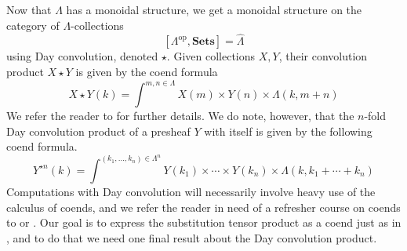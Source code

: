 \documentclass{amsbook} %
\newcommand{\mb}{\mathbf}
\numberwithin{section}{chapter}
\begin{document}
Now that $\mathbb{\Lambda}$ has a monoidal structure, we get a monoidal structure on the category of $\mathbb{\Lambda}$-collections
\[
[\mathbb{\Lambda}^{\textrm{op}}, \mb{Sets}] = \hat{\mathbb{\Lambda}}
\]
using Day convolution, denoted $\star$.  Given collections $X, Y$, their convolution product $X \star Y$ is given by the coend formula
\[
X \star Y (k) = \int^{m,n \in \mathbb{\Lambda}} X(m) \times Y(n) \times \mathbb{\Lambda}(k, m+n)
\]
We refer the reader to \cite{day-thesis} for further details.  We do note, however, that the $n$-fold Day convolution product of a presheaf $Y$ with itself is given by the following coend formula.
\[
Y^{\star n}(k) = \int^{(k_{1}, \ldots, k_{n}) \in \mathbb{\Lambda}^{n}} Y(k_{1}) \times \cdots \times Y(k_{n}) \times \mathbb{\Lambda}(k, k_{1} + \cdots + k_{n})
\]
Computations with Day convolution will necessarily involve heavy use of the calculus of coends, and we refer the reader in need of a refresher course on coends to \cite{maclane-catwork} or \cite{loregian}.  Our goal is to express the substitution tensor product as a coend just as in \cite{kelly-op}, and to do that we need one final result about the Day convolution product.
\end{document}
